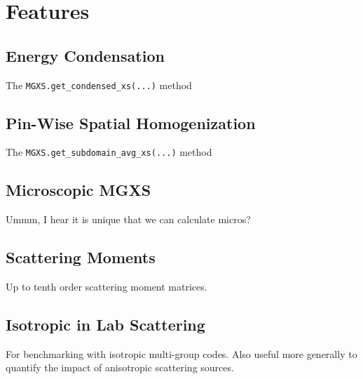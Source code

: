 \section{Features}
\label{sec:features}


\subsection{Energy Condensation}
\label{subsec:energy-condense}

The \texttt{MGXS.get_condensed_xs(...)} method


\subsection{Pin-Wise Spatial Homogenization}
\label{subsec:pinwise-homogenize}

The \texttt{MGXS.get_subdomain_avg_xs(...)} method


\subsection{Microscopic MGXS}
\label{subsec:micro-macro}

Ummm, I hear it is unique that we can calculate micros?


\subsection{Scattering Moments}
\label{subsec:scatt-moments}

Up to tenth order scattering moment matrices.


\subsection{Isotropic in Lab Scattering}
\label{subsec:iso-in-lab}

For benchmarking with isotropic multi-group codes. Also useful more generally to quantify the impact of anisotropic scattering sources.
